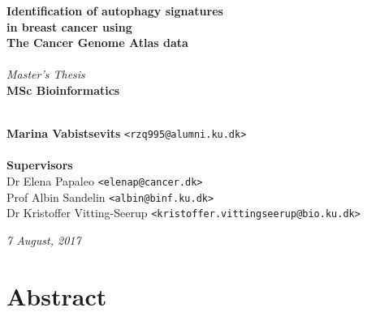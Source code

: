\documentclass[10pt, openright,oneside]{book}
\newcommand\blankpage{%
    \null
    \thispagestyle{empty}%
    \addtocounter{page}{-1}%
    \newpage}
\begin{document}
\frontmatter
    \thispagestyle{empty}
    
    \vspace*{4.5cm} 
    \noindent \textbf{\huge Identification of autophagy signatures\\ in breast cancer using\\ The Cancer Genome Atlas data} \\
    \\[0.5cm]
    \textit{\Large Master's Thesis} \\
    [0.5cm]
    \textbf{\Large MSc Bioinformatics} \\
    \vspace*{.1cm} \\
    \begin{tabbing}
    \textbf{Marina Vabistsevits} \hspace{1cm} \= \texttt{<rzq995@alumni.ku.dk>} \\
    \\[9cm]
    \textbf{\Large Supervisors} \\
    Dr Elena Papaleo \> \texttt{<elenap@cancer.dk>} \\
    Prof Albin Sandelin \> \texttt{<albin@binf.ku.dk>} \\
    Dr Kristoffer Vitting-Seerup\> \texttt{<kristoffer.vittingseerup@bio.ku.dk>}
    \\[1cm]
    
    \end{tabbing}
    \begin{center}
    \textit{7 August, 2017} 
    \end{center}

    \newpage
    \ClearWallPaper
    



\pagestyle{plain}




\afterpage{\blankpage} %

\chapter{Abstract}

\end{document}
